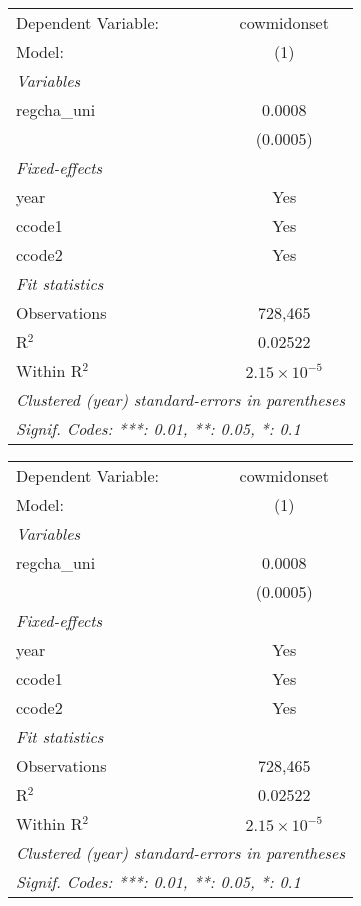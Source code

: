 
\begingroup
\centering
\begin{tabular}{lc}
   \tabularnewline \midrule \midrule
   Dependent Variable: & cowmidonset\\  
   Model:              & (1)\\  
   \midrule
   \emph{Variables}\\
   regcha\_uni         & 0.0008\\   
                       & (0.0005)\\   
   \midrule
   \emph{Fixed-effects}\\
   year                & Yes\\  
   ccode1              & Yes\\  
   ccode2              & Yes\\  
   \midrule
   \emph{Fit statistics}\\
   Observations        & 728,465\\  
   R$^2$               & 0.02522\\  
   Within R$^2$        & $2.15\times 10^{-5}$\\   
   \midrule \midrule
   \multicolumn{2}{l}{\emph{Clustered (year) standard-errors in parentheses}}\\
   \multicolumn{2}{l}{\emph{Signif. Codes: ***: 0.01, **: 0.05, *: 0.1}}\\
\end{tabular}
\par\endgroup



\begingroup
\centering
\begin{tabular}{lc}
   \tabularnewline \midrule \midrule
   Dependent Variable: & cowmidonset\\  
   Model:              & (1)\\  
   \midrule
   \emph{Variables}\\
   regcha\_uni         & 0.0008\\   
                       & (0.0005)\\   
   \midrule
   \emph{Fixed-effects}\\
   year                & Yes\\  
   ccode1              & Yes\\  
   ccode2              & Yes\\  
   \midrule
   \emph{Fit statistics}\\
   Observations        & 728,465\\  
   R$^2$               & 0.02522\\  
   Within R$^2$        & $2.15\times 10^{-5}$\\   
   \midrule \midrule
   \multicolumn{2}{l}{\emph{Clustered (year) standard-errors in parentheses}}\\
   \multicolumn{2}{l}{\emph{Signif. Codes: ***: 0.01, **: 0.05, *: 0.1}}\\
\end{tabular}
\par\endgroup



